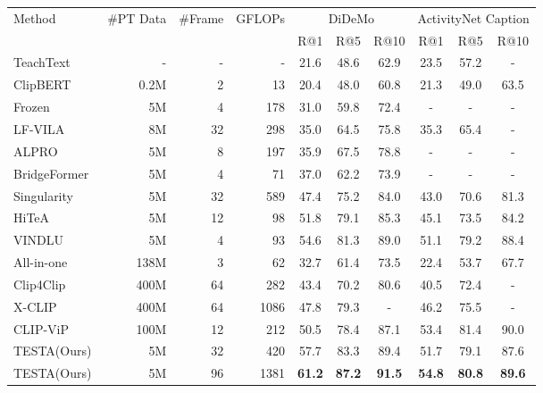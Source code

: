 \documentclass[11pt]{article}
\newcommand{\demph}[1]{\textcolor{demphcolor}{#1}}
\newcommand{\tablestyle}[2]{\setlength{\tabcolsep}{#1}\renewcommand{\arraystretch}{#2}\centering\small}
\newcommand{\modelname}{TESTA\xspace}
\def\mydemph{\demph}
\begin{document}
\begin{table*}[t!]
\centering
    \tablestyle{7pt}{1.1} 
    \def \w{15pt}
    \begin{adjustbox}{max width=\linewidth}

        \begin{tabular}{lrrr|ccc|ccc}
        \toprule
        \multirow{2}{*}{Method} & \multirow{2}{*}{\#PT Data} & \multirow{2}{*}{\#Frame} & \multirow{2}{*}{GFLOPs } & \multicolumn{3}{c|}{DiDeMo} & \multicolumn{3}{c}{ActivityNet Caption}\\
        \cmidrule(lr){5-7} \cmidrule(lr){8-10} 
         &  &  &  & R@1  & R@5  & R@10  & R@1  & R@5  & R@10  \\
        \midrule
        TeachText~\citep{Croitoru2021TeachTextCG} & - & - & - & 21.6 & 48.6 & 62.9 & 23.5 & 57.2 & - \\
        ClipBERT~\citep{Lei2021LessIM} & 0.2M & 2 & 13 & 20.4 & 48.0 & 60.8 & 21.3 & 49.0 & 63.5 \\
        Frozen~\citep{Bain2021FrozenIT} & 5M & 4 & 178 & 31.0 & 59.8 & 72.4 & - & - & - \\
        LF-VILA~\citep{Sun2022LongFormVP} & 8M & 32 & 298 & 35.0 & 64.5 & 75.8 & 35.3 & 65.4 & - \\
        ALPRO~\citep{Li2021AlignAP} & 5M & 8 & 197 & 35.9 & 67.5 & 78.8 & - & - & - \\
        BridgeFormer~\citep{Ge2022BridgingVR} & 5M & 4 & 71 & 37.0 & 62.2 & 73.9  & - & - & - \\
        Singularity~\citep{Lei2022RevealingSF} & 5M & 32 & 589 & 47.4 & 75.2 & 84.0 & 43.0 & 70.6 & 81.3 \\
        HiTeA~\citep{Ye2022HiTeAHT} & 5M & 12 & 98 & 51.8 & 79.1 & 85.3 & 45.1 & 73.5 & 84.2 \\
        VINDLU~\citep{Cheng2022VindLUAR} & 5M & 4 & 93 & 54.6 & 81.3 & 89.0 & 51.1 & 79.2 & 88.4 \\
        \mydemph{All-in-one~\citep{Wang2022AllIO}} & \mydemph{138M} & \mydemph{3} & \mydemph{62} & \mydemph{32.7} & \mydemph{61.4} & \mydemph{73.5} & \mydemph{22.4} & \mydemph{53.7} & \mydemph{67.7} \\
        \mydemph{Clip4Clip~\citep{Luo2021CLIP4ClipAE}} & \mydemph{400M} & \mydemph{64} & \mydemph{282} & \mydemph{43.4} & \mydemph{70.2} & \mydemph{80.6} & \mydemph{40.5} & \mydemph{72.4} & \mydemph{-} \\
        \mydemph{X-CLIP~\citep{Ma2022XCLIPEM}} & \mydemph{400M} & \mydemph{64} & \mydemph{1086} & \mydemph{47.8} & \mydemph{79.3} & \mydemph{-} & \mydemph{46.2} & \mydemph{75.5} & \mydemph{-} \\
\mydemph{CLIP-ViP~\citep{Xue2022CLIPViPAP}} & \mydemph{100M} & \mydemph{12} & \mydemph{212} & \mydemph{50.5} & \mydemph{78.4} & \mydemph{87.1} & \mydemph{53.4} & \mydemph{81.4} & \mydemph{90.0} \\
\midrule
\modelname (Ours) & 5M &  32 & 420 & 57.7 & 83.3 & 89.4 & 51.7 & 79.1 & 87.6 \\
\modelname (Ours) & 5M &  96 & 1381 & \textbf{61.2} & \textbf{87.2} & \textbf{91.5} & \textbf{54.8} & \textbf{80.8} & \textbf{89.6} \\
        \bottomrule
\end{tabular}



\end{adjustbox}
\end{table*}
\end{document}
